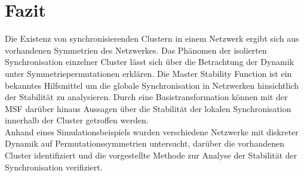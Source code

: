 \section{Fazit}\label{fazit}
Die Existenz von synchronisierenden Clustern in einem Netzwerk ergibt sich aus vorhandenen Symmetrien des Netzwerkes. Das Phänomen der isolierten Synchronisation einzelner Cluster lässt sich über die Betrachtung der Dynamik unter Symmetriepermutationen erklären. 
Die Master Stability Function ist ein bekanntes Hilfsmittel um die globale Synchronisation in Netzwerken hinsichtlich der Stabilität zu analysieren. Durch eine Basistransformation können mit der MSF darüber hinaus Aussagen über die Stabilität der lokalen Synchronisation innerhalb der Cluster getroffen werden.\\
Anhand eines Simulationsbeispiels wurden verschiedene Netzwerke mit diskreter Dynamik auf Permutationssymmetrien untersucht, darüber die vorhandenen Cluster identifiziert und die vorgestellte Methode zur Analyse der Stabilität der Synchronisation verifiziert.
